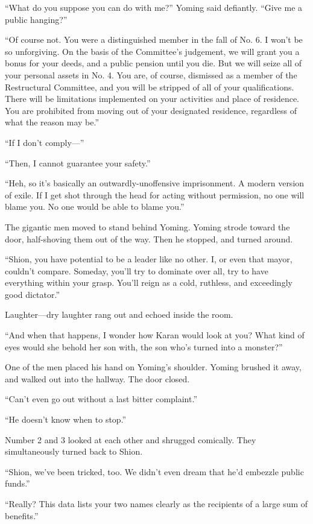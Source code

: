 ``What do you suppose you can do with me?'' Yoming said defiantly.
``Give me a public hanging?''

``Of course not. You were a distinguished member in the fall of No. 6. I
won't be so unforgiving. On the basis of the Committee's judgement, we
will grant you a bonus for your deeds, and a public pension until you
die. But we will seize all of your personal assets in No. 4. You are, of
course, dismissed as a member of the Restructural Committee, and you
will be stripped of all of your qualifications. There will be
limitations implemented on your activities and place of residence. You
are prohibited from moving out of your designated residence, regardless
of what the reason may be.''

``If I don't comply---''

``Then, I cannot guarantee your safety.''

``Heh, so it's basically an outwardly-unoffensive imprisonment. A modern
version of exile. If I get shot through the head for acting without
permission, no one will blame you. No one would be able to blame you.''

The gigantic men moved to stand behind Yoming. Yoming strode toward the
door, half-shoving them out of the way. Then he stopped, and turned
around.

``Shion, you have potential to be a leader like no other. I, or even
that mayor, couldn't compare. Someday, you'll try to dominate over all,
try to have everything within your grasp. You'll reign as a cold,
ruthless, and exceedingly good dictator.''

Laughter---dry laughter rang out and echoed inside the room.

``And when that happens, I wonder how Karan would look at you? What kind
of eyes would she behold her son with, the son who's turned into a
monster?''

One of the men placed his hand on Yoming's shoulder. Yoming brushed it
away, and walked out into the hallway. The door closed.

``Can't even go out without a last bitter complaint.''

``He doesn't know when to stop.''

Number 2 and 3 looked at each other and shrugged comically. They
simultaneously turned back to Shion.

``Shion, we've been tricked, too. We didn't even dream that he'd
embezzle public funds.''

``Really? This data lists your two names clearly as the recipients of a
large sum of benefits.''

